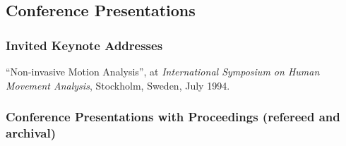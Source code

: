 \subsection{Conference Presentations}
\label{subsec:conference}

\subsubsection{Invited Keynote Addresses}
\label{subsubsec:invited}

\begin{pub}


\item ``Non-invasive Motion Analysis'', at \textit{International
Symposium on Human Movement Analysis}, Stockholm, Sweden, July 1994.

\end{pub}

\subsubsection{Conference Presentations with Proceedings (refereed and archival)}
\label{subsubsec:conference-archived}



